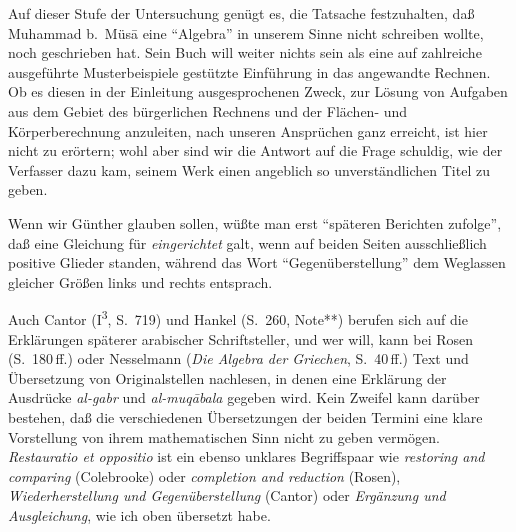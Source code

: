 \documentclass[11pt,a4paper]{article}
\newcommand{\enquote}[1]{``#1''}
\begin{document}
Auf dieser Stufe der Untersuchung gen\"ugt es, die Tatsache festzuhalten, da\ss{} Muhammad b.\ M\"us\=a eine \enquote{Algebra} in unserem Sinne nicht schreiben wollte, noch geschrieben hat. Sein Buch will weiter nichts sein als eine auf zahlreiche ausgef\"uhrte Musterbeispiele gest\"utzte Einf\"uhrung in das angewandte Rechnen. Ob es diesen in der Einleitung ausgesprochenen Zweck, zur L\"osung von Aufgaben aus dem Gebiet des b\"urgerlichen Rechnens und der Fl\"achen- und K\"orperberechnung anzuleiten, nach unseren Anspr\"uchen ganz erreicht, ist hier nicht zu er\"ortern; wohl aber sind wir die Antwort auf die Frage schuldig, wie der Verfasser dazu kam, seinem Werk einen angeblich so unverst\"andlichen Titel zu geben.

Wenn wir G\"unther glauben sollen, w\"u\ss{}te man erst \enquote{sp\"ateren Berichten zufolge}, da\ss{} eine Gleichung f\"ur \textit{eingerichtet} galt, wenn auf beiden Seiten ausschlie\ss{}lich positive Glieder standen, w\"ahrend das Wort \enquote{Gegen\"uberstellung} dem Weglassen gleicher Gr\"o\ss{}en links und rechts entsprach.

Auch Cantor (I\textsuperscript{3}, S.\ 719) und Hankel (S.\ 260, Note**) berufen sich auf die Erkl\"arungen sp\"aterer arabischer Schriftsteller, und wer will, kann bei Rosen (S.\ 180\,ff.) oder Nesselmann (\textit{Die Algebra der Griechen}, S.\ 40\,ff.) Text und \"Ubersetzung von Originalstellen nachlesen, in denen eine Erkl\"arung der Ausdr\"ucke \textit{al-gabr} und \textit{al-muq\=abala} gegeben wird. Kein Zweifel kann dar\"uber bestehen, da\ss{} die verschiedenen \"Ubersetzungen der beiden Termini eine klare Vorstellung von ihrem mathematischen Sinn nicht zu geben verm\"ogen. \textit{Restauratio et oppositio} ist ein ebenso unklares Begriffspaar wie \textit{restoring and comparing} (Colebrooke) oder \textit{completion and reduction} (Rosen), \textit{Wiederherstellung und Gegen\"uberstellung} (Cantor) oder \textit{Erg\"anzung und Ausgleichung}, wie ich oben \"ubersetzt habe.
\end{document}
